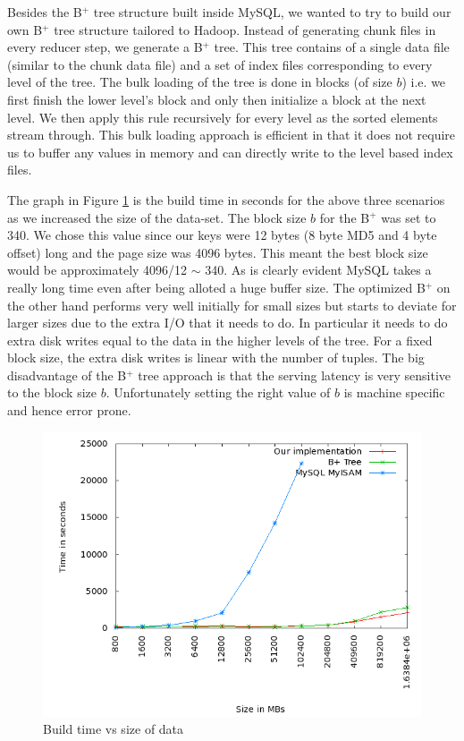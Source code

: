 \documentclass[10pt,twocolumn,preprint,natbib,authoryear]{sigplanconf}
\begin{document}
Besides the B$^{+}$ tree structure built inside MySQL, we wanted to try to build our own B$^{+}$ tree structure tailored to Hadoop. Instead of generating chunk files in every reducer step, we generate a B$^{+}$ tree. This tree contains of a single data file (similar to the chunk data file) and a set of index files corresponding to every level of the tree. The bulk loading of the tree is done in blocks (of size $b$) i.e. we first finish the lower level's block and only then initialize a block at the next level. We then apply this rule recursively for every level as the sorted elements stream through. This bulk loading approach is efficient in that it does not require us to buffer any values in memory and can directly write to the level based index files. 

The graph in Figure \ref{build} is the build time in seconds for the above three scenarios as we increased the size of the data-set. The block size $b$ for the B$^{+}$ was set to 340. We chose this value since our keys were 12 bytes (8 byte MD5 and 4 byte offset) long and the page size was 4096 bytes. This meant the best block size would be approximately 4096/12 $\sim$ 340. As is clearly evident MySQL takes a really long time even after being alloted a huge buffer size. The optimized B$^{+}$ on the other hand performs very well initially for small sizes but starts to deviate for larger sizes due to the extra I/O that it needs to do. In particular it needs to do extra disk writes equal to the data in the higher levels of the tree. For a fixed block size, the extra disk writes is linear with the number of tuples. The big disadvantage of the B$^{+}$ tree approach is that the serving latency is very sensitive to the block size $b$. Unfortunately setting the right value of $b$ is machine specific and hence error prone. 

\begin{figure}
  \centering
    \includegraphics[scale=0.35]{build.png}
  \caption{Build time vs size of data}
  \label{build}
\end{figure}
\end{document}
